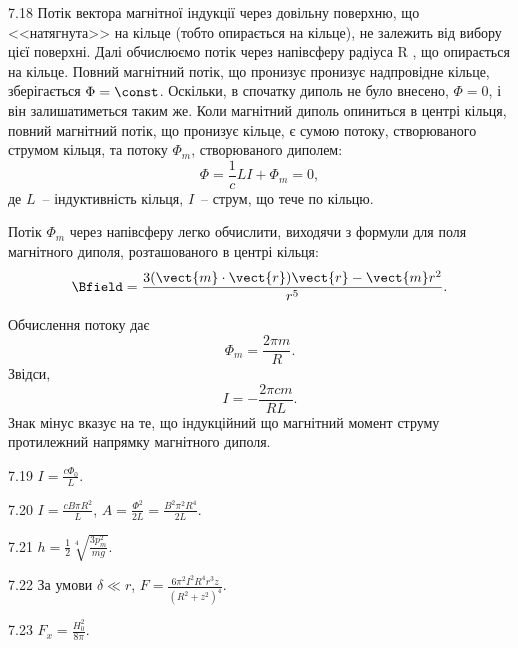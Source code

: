 \begin{Solution}{7.{18}}
    Потік вектора магнітної індукції через довільну поверхню, що <<натягнута>> на кільце (тобто опирається на кільце), не залежить від вибору цієї поверхні. Далі обчислюємо потік через напівсферу радіуса R , що опирається на кільце.  Повний магнітний потік, що пронизує пронизує надпровідне кільце, зберігається $\Phi = \const$. Оскільки, в спочатку диполь не було внесено, $\Phi = 0$, і він залишатиметься таким же. Коли магнітний диполь опиниться в центрі кільця, повний магнітний потік, що пронизує кільце, є сумою потоку, створюваного струмом кільця, та потоку $\Phi_m$, створюваного диполем:
	\[
		\Phi = \frac1c LI + \Phi_m = 0,
	\]
	де $L$~-- індуктивність кільця, $I$~-- струм, що тече по кільцю.

Потік $\Phi_m$ через напівсферу легко обчислити, виходячи з формули для поля магнітного диполя, розташованого в центрі кільця:
\[
    \Bfield = \frac{3(\vect{m}\cdot\vect{r})\vect{r}- \vect{m}r^2}{r^5}.
\]

Обчислення потоку дає
\[
  \Phi_m = \frac{2\pi m}{R} .
\]
%
%
%
	Звідси,
	\[
		I = - \frac{ 2\pi c m}{RL}.
	\]
	Знак мінус вказує на те, що індукційний що магнітний момент струму протилежний напрямку магнітного диполя.
\end{Solution}
\begin{Solution}{7.{19}}
	$I = \frac{c\Phi_0}{L}$.
\end{Solution}
\begin{Solution}{7.{20}}
	$I = \frac{cB\pi R^2}{L}$, $A = \frac{\Phi^2}{2L} = \frac{B^2\pi^2 R^4}{2L}$.
\end{Solution}
\begin{Solution}{7.{21}}
	$h = \frac12 \sqrt[4]{\frac{3p_m^2}{mg}}$.
\end{Solution}
\begin{Solution}{7.{22}}
    За умови $\delta \ll r$,   $F=\frac{6\pi^2 I^2 R^4 r^3 z}{(R^2+z^2)^4}$.
\end{Solution}
\begin{Solution}{7.{23}}
	$F_x = \frac{H_0^2}{8\pi}$.
\end{Solution}
